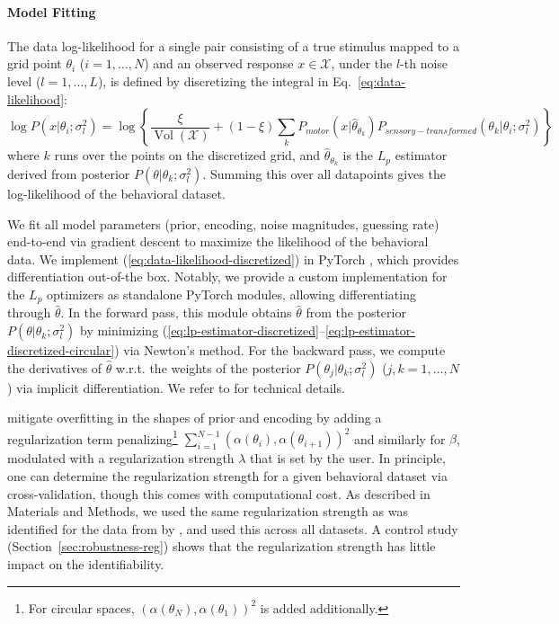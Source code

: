 \paragraph*{Model Fitting}
The data log-likelihood for a single pair consisting of a true stimulus mapped to a grid point $\theta_i$ ($i=1, \dots, N$) and an observed response $x \in \mathcal{X}$, under the $l$-th noise level ($l=1,\dots,L$), is defined by discretizing the integral in Eq.~\eqref{eq:data-likelihood}:
\begin{equation}\label{eq:data-likelihood-discretized}
\log P(x|\theta_i; \sigma_l^2) = \log \left\{\frac{\xi}{\operatorname{Vol}(\mathcal{X})} + (1-\xi)  \sum_k P_{motor}(x|\hat{\theta}_{\theta_k}) P_{sensory-transformed}(\theta_k|\theta_i; \sigma_l^2) \right\}
\end{equation}
where $k$ runs over the points on the discretized grid, and $\hat{\theta}_{\theta_k}$ is the $L_p$ estimator derived from posterior $P(\theta|\theta_k; \sigma_l^2)$.
Summing this over all datapoints gives the log-likelihood of the behavioral dataset.

We fit all model parameters (prior, encoding, noise magnitudes, guessing rate) end-to-end via gradient descent to maximize the likelihood of the behavioral data.
We implement (\ref{eq:data-likelihood-discretized}) in PyTorch \citep{DBLP:conf/nips/PaszkeGMLBCKLGA19}, which provides differentiation out-of-the box.
Notably, we provide a custom implementation for the $L_p$ optimizers as standalone PyTorch modules, allowing differentiating through $\hat{\theta}$. In the forward pass, this module obtains $\hat{\theta}$ from the posterior $P(\theta|\theta_k; \sigma_l^2)$ by minimizing (\ref{eq:lp-estimator-discretized}--\ref{eq:lp-estimator-discretized-circular}) via Newton's method. For the backward pass, we compute the derivatives of $\hat{\theta}$ w.r.t. the weights of the posterior $P(\theta_j|\theta_k; \sigma_l^2)$ ($j, k = 1, \dots, N$) via implicit differentiation.
We refer to \citet{hahn2024unifying} for technical details.

\citet{hahn2024unifying} mitigate overfitting in the shapes of prior and encoding by adding a regularization term penalizing\footnote{For circular spaces, $\left(\alpha(\theta_N), \alpha(\theta_{1})\right)^2$ is added additionally.} $\sum_{i=1}^{N-1} \left(\alpha(\theta_i), \alpha(\theta_{i+1})\right)^2$ and similarly for $\beta$, modulated with a regularization strength $\lambda$ that is set by the user.
In principle, one can determine the regularization strength for a given behavioral dataset via cross-validation, though this comes with computational cost. 
As described in Materials and Methods, we used the same regularization strength as was identified for the data from \citet{deGardelle2010AnOI} by \citet{hahn2024unifying}, and used this across all datasets.
A control study (Section~\ref{sec:robustness-reg}) shows that the regularization strength has little impact on the identifiability.
